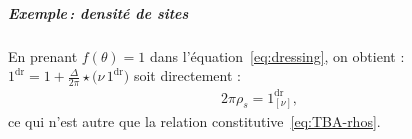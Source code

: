 \subparagraph{Exemple\,: densité de sites}

En prenant $f(\theta) = 1$ dans l’équation~\eqref{eq:dressing}, on obtient :
\(
1^{\mathrm{dr}}=1+\frac{\Delta}{2\pi}\star\bigl(\nu\,1^{\mathrm{dr}}\bigr)
\) soit directement : 
\begin{eqnarray}
	2\pi\rho_s = 1^{\mathrm{dr}}_{[\nu]},\label{eq:TBA-rhos-2}
\end{eqnarray}
ce qui n’est autre que la relation constitutive~\eqref{eq:TBA-rhos}.


